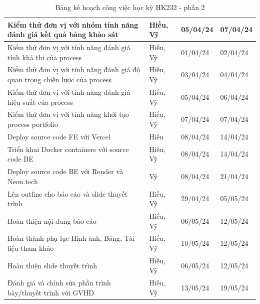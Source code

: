 \begin{table}[H]
{\begin{tabular}{|p{11cm}|p{1.75cm}|p{1.5cm}|p{1.5cm}|}
        { Kiểm thử đơn vị với nhóm tính năng đánh giá kết quả bảng khảo sát} &
        { Hiếu, Vỹ} &
        { 05/04/24} &
        { 07/04/24} \\ \hline
        { Kiểm thử đơn vị với tính năng đánh giá tính khả thi của process} &
        { Hiếu, Vỹ} &
        { 01/04/24} &
        { 02/04/24} \\ \hline
        { Kiểm thử đơn vị với tính năng đánh giá độ quan trọng chiến lược của process} &
        { Hiếu, Vỹ} &
        { 03/04/24} &
        { 04/04/24} \\ \hline
        { Kiểm thử đơn vị với tính năng đánh giá hiệu suất của process} &
        { Hiếu, Vỹ} &
        { 05/04/24} &
        { 06/04/24} \\ \hline
        { Kiểm thử đơn vị với tính năng khởi tạo process portfolio} &
        { Hiếu, Vỹ} &
        { 07/04/24} &
        { 07/04/24} \\ \hline
        { Deploy source code FE với Vercel} &
        { Hiếu} &
        { 08/04/24} &
        { 14/04/24} \\ \hline
        { Triển khai Docker containers với source code BE} &
        { Hiếu, Vỹ} &
        { 08/04/24} &
        { 14/04/24} \\ \hline
        { Deploy source code BE với Render và Neon.tech} &
        { Vỹ} &
        { 08/04/24} &
        { 21/04/24} \\ \hline
        { Lên outline cho báo cáo và slide thuyết trình} &
        { Hiếu, Vỹ} &
        { 29/04/24} &
        { 05/05/24} \\ \hline
        { Hoàn thiện nội dung báo cáo} &
        { Hiếu, Vỹ} &
        { 06/05/24} &
        { 12/05/24} \\ \hline
        { Hoàn thành phụ lục Hình ảnh, Bảng, Tài liệu tham khảo} &
        { Hiếu, Vỹ} &
        { 10/05/24} &
        { 12/05/24} \\ \hline
        { Hoàn thiện slide thuyết trình} &
        { Hiếu, Vỹ} &
        { 06/05/24} &
        { 12/05/24} \\ \hline
        { Đánh giá và chỉnh sửa phần trình bày/thuyết trình với GVHD} &
        { Hiếu, Vỹ} &
        { 13/05/24} &
        { 19/05/24} \\ \hline
    \end{tabular}%
    }
    \caption{Bảng kế hoạch công việc học kỳ HK232 - phần 2}
\end{table}